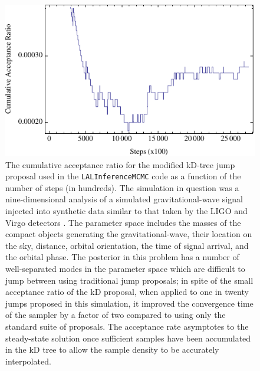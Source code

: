 \documentclass{rsos}
\newcommand{\ilya}[1]{{\color{red} \bf #1}}
\newcommand{\dan}[1]{{\color{magenta} \bf #1}}
\begin{document}
\begin{figure}
  \begin{center}
    \includegraphics[width=0.8\columnwidth]{linearlog3}
  \end{center}
  \caption{\label{fig:accratio} The cumulative acceptance
    ratio for the modified kD-tree jump proposal used in the
    \texttt{LALInferenceMCMC} code as a function of the number of
    steps (in hundreds). The simulation in question was a
    nine-dimensional analysis of a simulated gravitational-wave signal
    injected into synthetic data similar to that taken by the LIGO
    and Virgo detectors \cite{AdvLIGO,AdvVirgo}.  The parameter space
    includes the masses of the compact objects generating the
    gravitational-wave, their location on the sky, distance, orbital
    orientation, the time of signal arrival, and the orbital phase.
    The posterior in this problem has a number of well-separated modes
    in the parameter space which are difficult to jump between using
    traditional jump proposals; in spite of the small acceptance ratio
    of the kD proposal, when applied to one in twenty jumps proposed
    in this simulation, it improved the convergence time of the sampler by a factor of two
    compared to using only the standard suite of proposals. 
    The acceptance rate asymptotes to the steady-state solution once sufficient samples have been accumulated in the kD tree to allow the sample density to be accurately interpolated.
  }
\end{figure}
\end{document}
